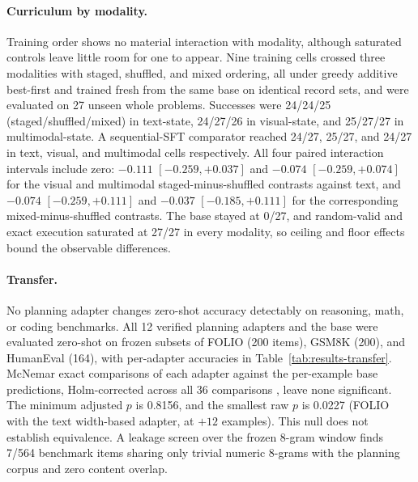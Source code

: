 \paragraph{Curriculum by modality.} Training order shows no material interaction with modality, although saturated controls leave little room for one to appear. Nine training cells crossed three modalities with staged, shuffled, and mixed ordering, all under greedy additive best-first and trained fresh from the same base on identical record sets, and were evaluated on 27 unseen whole problems. Successes were 24/24/25 (staged/shuffled/mixed) in text-state, 24/27/26 in visual-state, and 25/27/27 in multimodal-state. A sequential-SFT comparator reached 24/27, 25/27, and 24/27 in text, visual, and multimodal cells respectively. All four paired interaction intervals include zero: $-0.111$ $[-0.259, +0.037]$ and $-0.074$ $[-0.259, +0.074]$ for the visual and multimodal staged-minus-shuffled contrasts against text, and $-0.074$ $[-0.259, +0.111]$ and $-0.037$ $[-0.185, +0.111]$ for the corresponding mixed-minus-shuffled contrasts. The base stayed at 0/27, and random-valid and exact execution saturated at 27/27 in every modality, so ceiling and floor effects bound the observable differences.

\paragraph{Transfer.} No planning adapter changes zero-shot accuracy detectably on reasoning, math, or coding benchmarks. All 12 verified planning adapters and the base were evaluated zero-shot on frozen subsets of FOLIO \citep{han2022folio} (200 items), GSM8K \citep{cobbe2021gsm8k} (200), and HumanEval \citep{chen2021humaneval} (164), with per-adapter accuracies in Table~\ref{tab:results-transfer}. McNemar exact comparisons \citep{mcnemar1947note} of each adapter against the per-example base predictions, Holm-corrected across all 36 comparisons \citep{holm1979simple}, leave none significant. The minimum adjusted $p$ is 0.8156, and the smallest raw $p$ is 0.0227 (FOLIO with the text width-based adapter, at $+12$ examples). This null does not establish equivalence. A leakage screen over the frozen 8-gram window finds 7/564 benchmark items sharing only trivial numeric 8-grams with the planning corpus and zero content overlap.

